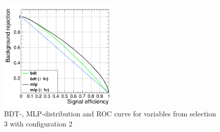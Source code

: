 \documentclass[11pt]{scrartcl}
\begin{document}
\begin{figure}[H]
\begin{minipage}{.5\textwidth}
	  \label{fig:distr_s3_config2_mlp}
	\end{minipage}
	\centering
	\includegraphics[width=0.5\textwidth]{figures/MVA/select3/config2/FOM_selection3_nL7_nT800_mD3_nC20.png}
	\caption{BDT-, MLP-distribution and ROC curve for variables from selection 3 with configuration 2}
	 \label{fig:ROC_s3_config2}	
	\end{figure}
	
\end{document}
